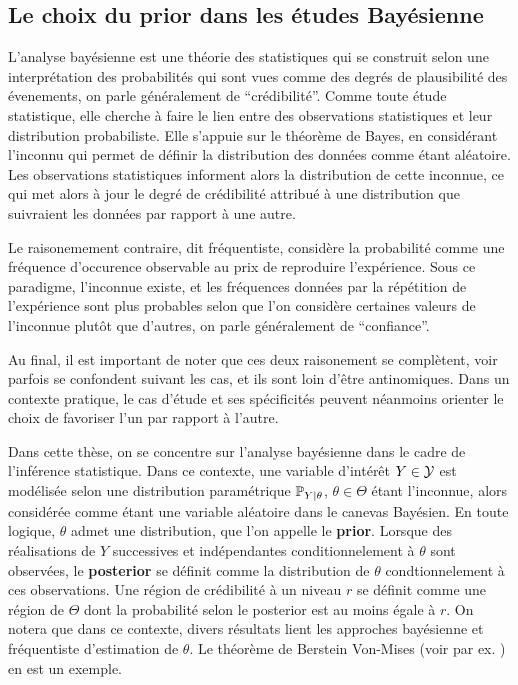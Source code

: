 \subsection{Le choix du prior dans les études Bayésienne}



L'analyse bayésienne est une théorie des statistiques qui se construit selon une interprétation des probabilités qui sont vues comme des degrés de plausibilité des évenements, on parle généralement de ``crédibilité''. 
Comme toute étude statistique, elle cherche à faire le lien entre des observations statistiques et leur distribution probabiliste. %
Elle s'appuie sur le théorème de Bayes, en considérant l'inconnu qui permet de définir la distribution des données comme étant aléatoire. Les observations statistiques informent alors la distribution de cette inconnue, ce qui met alors à jour le degré de crédibilité attribué à une distribution que suivraient les données par rapport à une autre.


Le raisonemement contraire, dit fréquentiste, considère la probabilité comme une fréquence d'occurence observable au prix de reproduire l'expérience. Sous ce paradigme, l'inconnue existe, 
et les fréquences données par la répétition de l'expérience sont plus probables selon que l'on considère certaines valeurs de l'inconnue plutôt que d'autres, on parle généralement de ``confiance''.


Au final, il est important de noter que ces deux raisonement se complètent, voir parfois se confondent suivant les cas, et ils sont loin d'être antinomiques. Dans un contexte pratique, le cas d'étude et ses spécificités peuvent néanmoins orienter le choix de favoriser l'un par rapport à l'autre.


Dans cette thèse, on se concentre sur l'analyse bayésienne dans le cadre de l'inférence statistique. Dans ce contexte, une variable d'intérêt $Y\in\mathcal{Y}$ est modélisée selon une distribution paramétrique $\mathbb{P}_{Y|\theta}$, $\theta\in\Theta$ étant l'inconnue, alors considérée comme étant une variable aléatoire dans le canevas Bayésien.
En toute logique, $\theta$ admet une distribution, que l'on appelle le \textbf{prior}.
Lorsque des réalisations de $Y$ successives et indépendantes conditionnelement à $\theta$ sont observées, le \textbf{posterior} se définit comme la distribution de $\theta$ condtionnelement à ces observations. Une région de crédibilité à un niveau $r$ se définit comme une région de $\Theta$ dont la probabilité selon le posterior est au moins égale à $r$.
On notera que dans ce contexte, divers résultats lient les approches bayésienne et fréquentiste d'estimation de $\theta$. Le théorème de Berstein Von-Mises (voir par ex. \cite{van_der_vaart_asymptotic_1992}) en est un exemple.


